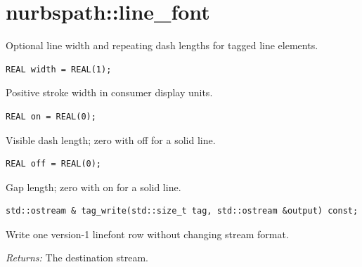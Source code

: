 \section{nurbspath::line\_font}
Optional line width and repeating dash lengths for tagged line elements.
\par\noindent\begin{minipage}{\linewidth}
\begin{lstlisting}[style=apireference]
REAL width = REAL(1);
\end{lstlisting}
{\footnotesize Positive stroke width in consumer display units.\par}
\end{minipage}\par\vspace{1pt}
\par\noindent\begin{minipage}{\linewidth}
\begin{lstlisting}[style=apireference]
REAL on = REAL(0);
\end{lstlisting}
{\footnotesize Visible dash length; zero with off for a solid line.\par}
\end{minipage}\par\vspace{1pt}
\par\noindent\begin{minipage}{\linewidth}
\begin{lstlisting}[style=apireference]
REAL off = REAL(0);
\end{lstlisting}
{\footnotesize Gap length; zero with on for a solid line.\par}
\end{minipage}\par\vspace{1pt}
\par\noindent\begin{minipage}{\linewidth}
\begin{lstlisting}[style=apireference]
std::ostream & tag_write(std::size_t tag, std::ostream &output) const;
\end{lstlisting}
{\footnotesize Write one version-1 linefont row without changing stream format.\par}
{\footnotesize\textit{Returns:} The destination stream.\par}
\end{minipage}\par\vspace{1pt}
